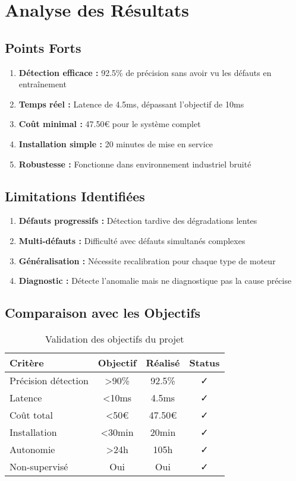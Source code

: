 \section{Analyse des Résultats}

\subsection{Points Forts}

\begin{enumerate}
    \item \textbf{Détection efficace :} 92.5\% de précision sans avoir vu les défauts en entraînement
    \item \textbf{Temps réel :} Latence de 4.5ms, dépassant l'objectif de 10ms
    \item \textbf{Coût minimal :} 47.50€ pour le système complet
    \item \textbf{Installation simple :} 20 minutes de mise en service
    \item \textbf{Robustesse :} Fonctionne dans environnement industriel bruité
\end{enumerate}

\subsection{Limitations Identifiées}

\begin{enumerate}
    \item \textbf{Défauts progressifs :} Détection tardive des dégradations lentes
    \item \textbf{Multi-défauts :} Difficulté avec défauts simultanés complexes
    \item \textbf{Généralisation :} Nécessite recalibration pour chaque type de moteur
    \item \textbf{Diagnostic :} Détecte l'anomalie mais ne diagnostique pas la cause précise
\end{enumerate}

\subsection{Comparaison avec les Objectifs}

\begin{table}[h]
\centering
\caption{Validation des objectifs du projet}
\begin{tabular}{lccc}
\toprule
\textbf{Critère} & \textbf{Objectif} & \textbf{Réalisé} & \textbf{Status} \\
\midrule
Précision détection & >90\% & 92.5\% & ✓ \\
Latence & <10ms & 4.5ms & ✓ \\
Coût total & <50€ & 47.50€ & ✓ \\
Installation & <30min & 20min & ✓ \\
Autonomie & >24h & 105h & ✓ \\
Non-supervisé & Oui & Oui & ✓ \\
\bottomrule
\end{tabular}
\end{table}

